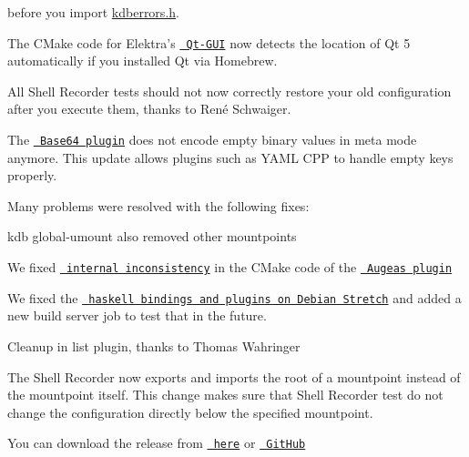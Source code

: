 \begin{DoxyCode}{0}
\end{DoxyCode}


before you import {\ttfamily \mbox{\hyperlink{kdberrors_8h}{kdberrors.\+h}}}.


\begin{DoxyItemize}
\item The C\+Make code for Elektra’s \href{https://www.libelektra.org/tools/qt-gui}{\texttt{ Qt-\/\+G\+UI}} now detects the location of Qt 5 automatically if you installed Qt via Homebrew.
\item All Shell Recorder tests should not now correctly restore your old configuration after you execute them, thanks to René Schwaiger.
\item The \href{https://www.libelektra.org/plugins/base64}{\texttt{ Base64 plugin}} does not encode empty binary values in meta mode anymore. This update allows plugins such as Y\+A\+ML C\+PP to handle empty keys properly.
\end{DoxyItemize}

Many problems were resolved with the following fixes\+:


\begin{DoxyItemize}
\item {\ttfamily kdb global-\/umount} also removed other mountpoints
\item We fixed \href{https://github.com/ElektraInitiative/libelektra/pull/1761}{\texttt{ internal inconsistency}} in the C\+Make code of the \href{https://www.libelektra.org/plugins/augeas}{\texttt{ Augeas plugin}}
\item We fixed the \href{https://github.com/ElektraInitiative/libelektra/pull/1787}{\texttt{ haskell bindings and plugins on Debian Stretch}} and added a new build server job to test that in the future.
\item Cleanup in list plugin, thanks to Thomas Wahringer
\item The Shell Recorder now exports and imports the root of a mountpoint instead of the mountpoint itself. This change makes sure that Shell Recorder test do not change the configuration directly below the specified mountpoint.
\end{DoxyItemize}

You can download the release from \href{https://www.libelektra.org/ftp/elektra/releases/elektra-0.8.22.tar.gz}{\texttt{ here}} or \href{https://github.com/ElektraInitiative/ftp/blob/master/releases/elektra-0.8.22.tar.gz?raw=true}{\texttt{ Git\+Hub}}

